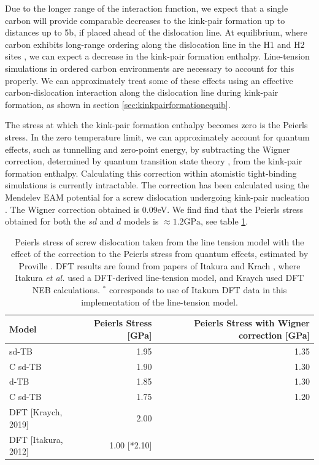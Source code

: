 \documentclass[a4paper,12pt,oneside,print,numbered,index,PageStyleIII]{PhDThesisPSnPDF}
\begin{document}
\begin{enumerate}
Due to the longer range of the interaction function, we expect that a single carbon
will provide comparable decreases to the kink-pair formation up to distances up to 5b,
if placed ahead of the dislocation line. At equilibrium, where carbon exhibits
long-range ordering along the dislocation line in the H1 and H2 sites \cite{Luthi2019},
we can expect a decrease in the kink-pair formation enthalpy. Line-tension simulations in
ordered carbon environments are necessary to account for this properly. We can approximately
treat some of these effects using an effective carbon-dislocation interaction
along the dislocation line during kink-pair formation, as shown in section
\ref{sec:kinkpairformationequib}.



The stress at which the kink-pair formation enthalpy becomes zero is the Peierls
stress. In the zero temperature limit, we can approximately account for quantum
effects, such as tunnelling and zero-point energy, by subtracting the Wigner
correction, determined by quantum transition state theory
\cite{Proville2012,Henkelman2006}, from the kink-pair formation enthalpy. Calculating
this correction within atomistic tight-binding simulations is currently
intractable. The correction has been calculated using the Mendelev EAM potential
\cite{Mendelev2003} for a screw dislocation undergoing kink-pair nucleation
\cite{Proville2012}. The Wigner correction obtained is 0.09eV. We find find that the
Peierls stress obtained for both the \(sd\) and \(d\) models is \(\approx1.2\text{GPa}\), see table
\ref{wignercorrection}.


\begin{table}[htbp]
\caption{Peierls stress of screw dislocation taken from the line tension model with the effect of the correction to the Peierls stress from quantum effects, estimated by Proville \cite{Proville2012}. DFT results are found from papers of Itakura and Krach \cite{Itakura2012,Kraych2019}, where Itakura \emph{et al.} used a DFT-derived line-tension model, and Kraych used DFT NEB calculations. \(^{*}\) corresponds to use of Itakura DFT data in this implementation of the line-tension model.  \label{wignercorrection}}
\centering
\begin{tabular}{lrr}
Model & Peierls Stress [GPa] & Peierls Stress with Wigner correction [GPa]\\
\hline
sd-TB & 1.95 & 1.35\\
C sd-TB & 1.90 & 1.30\\
\hline
d-TB & 1.85 & 1.30\\
C sd-TB & 1.75 & 1.20\\
\hline
DFT [Kraych, 2019] & 2.00 & \\
DFT [Itakura, 2012] & 1.00 [*2.10] & \\
\end{tabular}
\end{table}




\end{enumerate}
\end{document}
